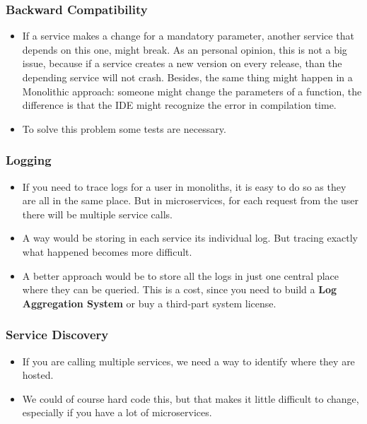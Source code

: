 \subsubsection{Backward Compatibility}
\begin{itemize}
    \item If a service makes a change for a mandatory parameter, another service that depends on 
    this one, might break. As an personal opinion, this is not a big issue, because if a service
    creates a new version on every release, than the depending service will not crash. Besides, 
    the same thing might happen in a Monolithic approach: someone might change the parameters of 
    a function, the difference is that the IDE might recognize the error in compilation time. 
    \item To solve this problem some tests are necessary. 
\end{itemize}

\subsubsection{Logging}
\begin{itemize}
    \item If you need to trace logs for a user in monoliths, it is easy to do so as 
    they are all in the same place. But in microservices, for each request from the 
    user there will be multiple service calls.
    \item A way would be storing in each service its individual log. But tracing exactly what 
    happened becomes more difficult. 
    \item A better approach would be to store all the logs in just one central place where they
    can be queried. This is a cost, since you need to build a \textbf{Log Aggregation System} or 
    buy a third-part system license. 
\end{itemize}

\subsubsection{Service Discovery}
    \begin{itemize}
        \item If you are calling multiple services, we need a way to identify where they are hosted.
        \item We could of course hard code this, but that makes it little difficult to change, especially 
        if you have a lot of microservices. 
    \end{itemize}

